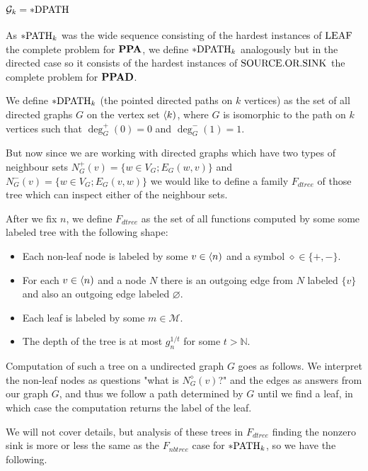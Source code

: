 \section{$\mathcal{G}_k=*\text{DPATH}$}

As $*\text{PATH}_k$ was the wide sequence consisting of the hardest instances of $\text{LEAF}$ the complete problem for $\textbf{PPA}$, we define $*\text{DPATH}_k$ analogously but in the directed case so it consists of the hardest instances of $\text{SOURCE.OR.SINK}$ the complete problem for $\textbf{PPAD}$.


\begin{defi}
We define $*\text{DPATH}_k$ (the pointed directed paths on $k$ vertices) as the set of all directed graphs $G$ on the vertex set $\langle k)$, where $G$ is isomorphic to the path on $k$ vertices such that $\deg_G^{+}(0)=0$ and $\deg_G^{-}(1)=1$.
\end{defi}

But now since we are working with directed graphs which have two types of neighbour sets $N_G^+(v)=\{w\in V_G;E_G(w,v)\}$ and $N_G^-(v)=\{w\in V_G;E_G(v,w)\}$ we would like to define a family $F_{dtree}$ of those tree which can inspect either of the neighbour sets.

\begin{defi}
After we fix $n$, we define $F_{dtree}$ as the set of all functions computed by some some labeled tree with the following shape:

\begin{itemize}
\item Each non-leaf node is labeled by some $v\in\langle n)$ and a symbol $\diamond\in\{+,-\}$. 
\item For each $v \in \langle n)$ and a node $N$ there is an outgoing edge from $N$ labeled $\{v\}$ and also an outgoing edge labeled $\varnothing$.
\item Each leaf is labeled by some $m\in \mathcal{M}$.
\item The depth of the tree is at most $g_n^{1/t}$ for some $t>\mathbb{N}$.
\end{itemize}

Computation of such a tree on a undirected graph $G$ goes as follows. We interpret the non-leaf nodes as questions "what is $N_G^\diamond(v)$?" and the edges as answers from our graph $G$, and thus we follow a path determined by $G$ until we find a leaf, in which case the computation returns the label of the leaf.
\end{defi}

We will not cover details, but analysis of these trees in $F_{dtree}$ finding the nonzero sink is more or less the same as the $F_{nbtree}$ case for $*\text{PATH}_k$, so we have the following.

